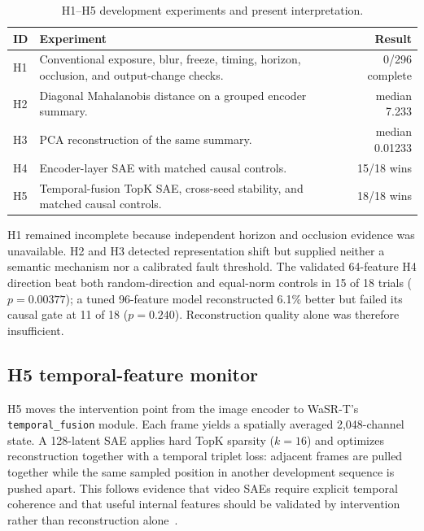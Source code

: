 \documentclass[sigconf,nonacm]{acmart}
\begin{document}
\begin{table}[t]
\centering
\caption{H1--H5 development experiments and present interpretation.}
\label{tab:health}
\scriptsize
\begin{tabularx}{\columnwidth}{@{}lXr@{}}
\toprule
ID & Experiment & Result \\
\midrule
H1 & Conventional exposure, blur, freeze, timing, horizon, occlusion, and output-change checks. & 0/296 complete \\
H2 & Diagonal Mahalanobis distance on a grouped encoder summary. & median 7.233 \\
H3 & PCA reconstruction of the same summary. & median 0.01233 \\
H4 & Encoder-layer SAE with matched causal controls. & 15/18 wins \\
H5 & Temporal-fusion TopK SAE, cross-seed stability, and matched causal controls. & 18/18 wins \\
\bottomrule
\end{tabularx}
\end{table}

H1 remained incomplete because independent horizon and occlusion evidence was
unavailable. H2 and H3 detected representation shift but supplied neither a
semantic mechanism nor a calibrated fault threshold. The validated 64-feature
H4 direction beat both random-direction and equal-norm controls in 15 of 18
trials ($p=0.00377$); a tuned 96-feature model reconstructed 6.1\% better but
failed its causal gate at 11 of 18 ($p=0.240$). Reconstruction quality alone was
therefore insufficient.

\subsection{H5 temporal-feature monitor}
H5 moves the intervention point from the image encoder to WaSR-T's
\texttt{temporal\_fusion} module. Each frame yields a spatially averaged
2,048-channel state. A 128-latent SAE applies hard TopK sparsity ($k=16$) and
optimizes reconstruction together with a temporal triplet loss: adjacent frames
are pulled together while the same sampled position in another development
sequence is pushed apart. This follows evidence that video SAEs require explicit
temporal coherence and that useful internal features should be validated by
intervention rather than reconstruction alone~\cite{stsae,circuits,patching}.
\end{document}
